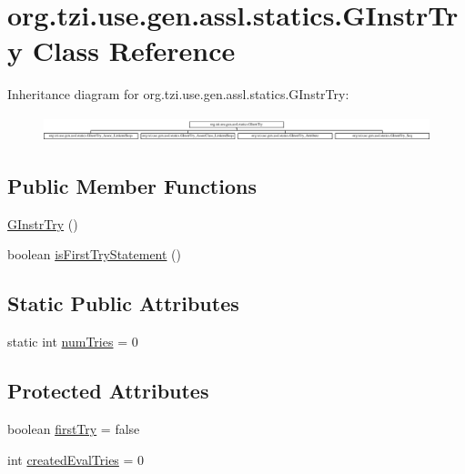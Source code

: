 \hypertarget{classorg_1_1tzi_1_1use_1_1gen_1_1assl_1_1statics_1_1_g_instr_try}{\section{org.\-tzi.\-use.\-gen.\-assl.\-statics.\-G\-Instr\-Try Class Reference}
\label{classorg_1_1tzi_1_1use_1_1gen_1_1assl_1_1statics_1_1_g_instr_try}
}
Inheritance diagram for org.\-tzi.\-use.\-gen.\-assl.\-statics.\-G\-Instr\-Try\-:\begin{figure}[H]
\begin{center}
\leavevmode
\includegraphics[height=0.744681cm]{classorg_1_1tzi_1_1use_1_1gen_1_1assl_1_1statics_1_1_g_instr_try}
\end{center}
\end{figure}
\subsection*{Public Member Functions}
\begin{DoxyCompactItemize}
\item 
\hyperlink{classorg_1_1tzi_1_1use_1_1gen_1_1assl_1_1statics_1_1_g_instr_try_a6095b4347e0494df341cfaff3ef92234}{G\-Instr\-Try} ()
\item 
boolean \hyperlink{classorg_1_1tzi_1_1use_1_1gen_1_1assl_1_1statics_1_1_g_instr_try_aea71d6e51c80376082a7c796e6f1c7ff}{is\-First\-Try\-Statement} ()
\end{DoxyCompactItemize}
\subsection*{Static Public Attributes}
\begin{DoxyCompactItemize}
\item 
static int \hyperlink{classorg_1_1tzi_1_1use_1_1gen_1_1assl_1_1statics_1_1_g_instr_try_ad71281ace40373d77f99659edce65236}{num\-Tries} = 0
\end{DoxyCompactItemize}
\subsection*{Protected Attributes}
\begin{DoxyCompactItemize}
\item 
boolean \hyperlink{classorg_1_1tzi_1_1use_1_1gen_1_1assl_1_1statics_1_1_g_instr_try_acab3cf9a78ceb695d8d240c2cb8680d2}{first\-Try} = false
\item 
int \hyperlink{classorg_1_1tzi_1_1use_1_1gen_1_1assl_1_1statics_1_1_g_instr_try_aeff1fece53d9d6ef237433377fd69568}{created\-Eval\-Tries} = 0
\end{DoxyCompactItemize}


